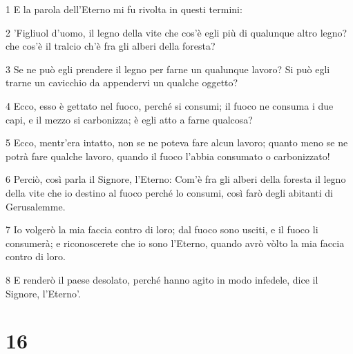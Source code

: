 \par 1 E la parola dell'Eterno mi fu rivolta in questi termini:
\par 2 'Figliuol d'uomo, il legno della vite che cos'è egli più di qualunque altro legno? che cos'è il tralcio ch'è fra gli alberi della foresta?
\par 3 Se ne può egli prendere il legno per farne un qualunque lavoro? Si può egli trarne un cavicchio da appendervi un qualche oggetto?
\par 4 Ecco, esso è gettato nel fuoco, perché si consumi; il fuoco ne consuma i due capi, e il mezzo si carbonizza; è egli atto a farne qualcosa?
\par 5 Ecco, mentr'era intatto, non se ne poteva fare alcun lavoro; quanto meno se ne potrà fare qualche lavoro, quando il fuoco l'abbia consumato o carbonizzato!
\par 6 Perciò, così parla il Signore, l'Eterno: Com'è fra gli alberi della foresta il legno della vite che io destino al fuoco perché lo consumi, così farò degli abitanti di Gerusalemme.
\par 7 Io volgerò la mia faccia contro di loro; dal fuoco sono usciti, e il fuoco li consumerà; e riconoscerete che io sono l'Eterno, quando avrò vòlto la mia faccia contro di loro.
\par 8 E renderò il paese desolato, perché hanno agito in modo infedele, dice il Signore, l'Eterno'.

\chapter{16}


